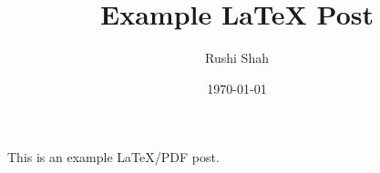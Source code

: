 \documentclass{article}
\author{Rushi Shah}
\date{\today}
\title{Example LaTeX Post}
\begin{document}
\maketitle
This is an example LaTeX/PDF post.
\end{document}
